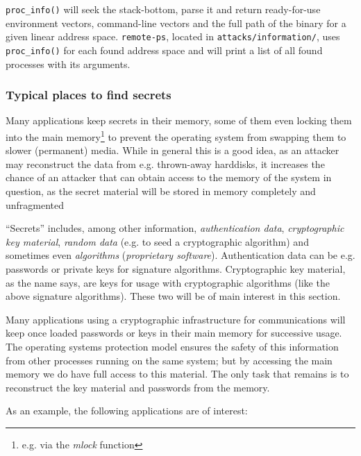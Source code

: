 \texttt{proc\_info()} will seek the stack-bottom, parse it and return
ready-for-use environment vectors, command-line vectors and the full path of the
binary for a given linear address space. \texttt{remote-ps}, located in
\texttt{attacks/information/}, uses \texttt{proc\_info()} for each found address
space and will print a list of all found processes with its arguments.


\subsubsection{Typical places to find secrets}

Many applications keep secrets in their memory, some of them even locking them
into the main memory\footnote{e.g\@. via the \emph{mlock} function} to prevent
the operating system from swapping them to slower (permanent) media. While in
general this is a good idea, as an attacker may reconstruct the data from e.g\@.
thrown-away harddisks, it increases the chance of an attacker that can obtain
access to the memory of the system in question, as the secret material will be
stored in memory completely and unfragmented

``Secrets'' includes, among other information, \emph{authentication data},
\emph{cryptographic key material}, \emph{random data} (e.g\@. to seed a
cryptographic algorithm) and sometimes even \emph{algorithms} (\emph{proprietary
software}). Authentication data can be e.g\@. passwords or private keys for
signature algorithms. Cryptographic key material, as the name says, are keys for
usage with cryptographic algorithms (like the above signature algorithms). These
two will be of main interest in this section.

Many applications using a cryptographic infrastructure for communications will
keep once loaded passwords or keys in their main memory for successive usage.
The operating systems protection model ensures the safety of this information
from other processes running on the same system; but by accessing the main
memory we do have full access to this material. The only task that remains is to
reconstruct the key material and passwords from the memory.

As an example, the following applications are of interest:

